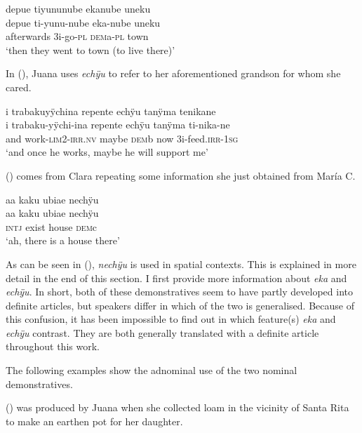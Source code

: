 \ea\label{ex:dema-intro}
\begingl
\glpreamble depue tiyununube ekanube uneku\\
\gla depue ti-yunu-nube eka-nube uneku\\
\glb afterwards 3i-go-\textsc{pl} \textsc{dem}a-\textsc{pl} town\\
\glft ‘then they went to town (to live there)’
\endgl
\trailingcitation{[rxx-p181101l-2.266]}
\xe


In (), Juana uses \textit{echÿu} to refer to her aforementioned grandson for whom she cared.

\ea\label{ex:demb-intro}
\begingl
\glpreamble i trabakuyÿchina repente echÿu tanÿma tenikane\\
\gla i trabaku-yÿchi-ina repente echÿu tanÿma ti-nika-ne\\
\glb and work-\textsc{lim}2-\textsc{irr.nv} maybe \textsc{dem}b now 3i-feed.\textsc{irr}-1\textsc{sg}\\
\glft ‘and once he works, maybe he will support me’
\endgl
\trailingcitation{[jxx-p110923l-1.208-211]}
\xe

() comes from Clara repeating some information she just obtained from María C.

\ea\label{ex:demc-intro}
\begingl
\glpreamble aa kaku ubiae nechÿu\\
\gla aa kaku ubiae nechÿu\\
\glb \textsc{intj} exist house \textsc{dem}c\\
\glft ‘ah, there is a house there’
\endgl
\trailingcitation{[cux-c120510l-1.244]}
\xe


As can be seen in (), \textit{nechÿu} is used in spatial contexts. This is explained in more detail in the end of this section. I first provide more information about \textit{eka} and \textit{echÿu}. In short, both of these demonstratives seem to have partly developed into definite articles, but speakers differ in which of the two is generalised. Because of this confusion, it has been impossible to find out in which feature(s) \textit{eka} and \textit{echÿu} contrast. They are both generally translated with a definite article throughout this work.

The following examples show the adnominal use of the two nominal demonstratives. 

() was produced by Juana when she collected loam in the vicinity of Santa Rita to make an earthen pot for her daughter.


